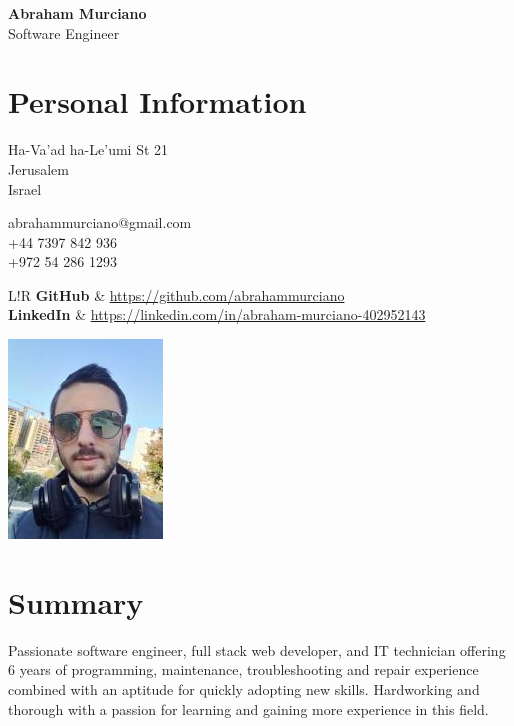 \documentclass{article}
\newcommand\VRule{\color{lightgray}\vrule width 0.4pt}
\begin{document}
\hspace{-19.4pt}
\begin{minipage}{0.8\textwidth}
	{\bfseries\Huge Abraham Murciano}\vspace{4pt}\\
	{\large Software Engineer}

	\section*{Personal Information}
	\begin{multicols}{2}
		Ha-Va'ad ha-Le'umi St 21\\
		Jerusalem\\
		Israel
		\columnbreak

		abrahammurciano@gmail.com\\
		+44 7397 842 936\\
		+972 54 286 1293
		\columnbreak
	\end{multicols}
	\begin{tabular}{L!{\VRule}R}
		\textbf{GitHub}   & \url{https://github.com/abrahammurciano} \\
		\textbf{LinkedIn} & \url{https://linkedin.com/in/abraham-murciano-402952143}
	\end{tabular}
\end{minipage}
%
\hspace{-20pt}
\begin{minipage}{0.2\textwidth}
	\begin{flushright}
		\includegraphics{profile.jpg}
	\end{flushright}
\end{minipage}

\section*{Summary}
Passionate software engineer, full stack web developer, and IT technician offering 6 years of programming, maintenance, troubleshooting and repair experience combined with an aptitude for quickly adopting new skills. Hardworking and thorough with a passion for learning and gaining more experience in this field.
\end{document}
